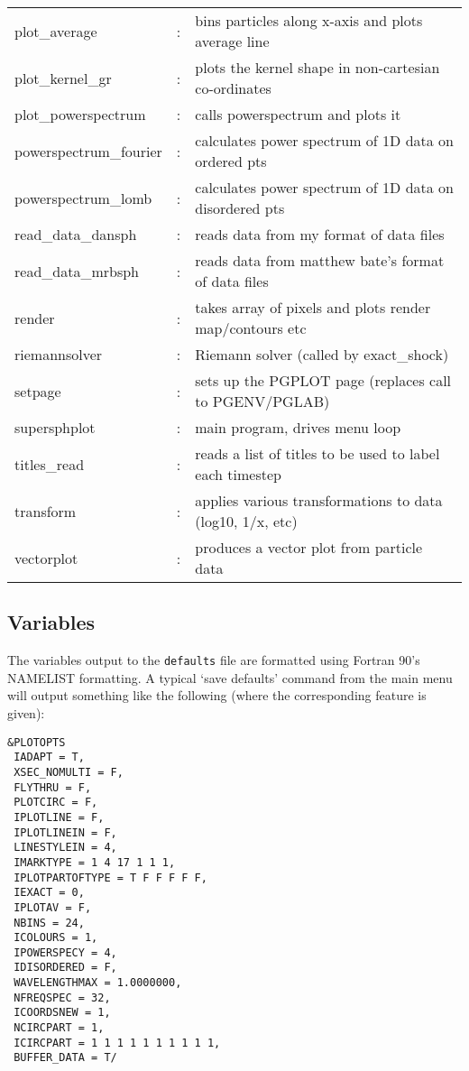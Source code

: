 \documentclass[a4paper,12pt]{article}
\begin{document}
\begin{longtable}{|lcp{}|}
plot\_average	 & : & bins particles along x-axis and plots average line\\
plot\_kernel\_gr     & : & plots the kernel shape in non-cartesian co-ordinates\\
plot\_powerspectrum & : & calls powerspectrum and plots it\\
powerspectrum\_fourier & : & calculates power spectrum of 1D data on ordered pts\\
powerspectrum\_lomb & : & calculates power spectrum of 1D data on disordered pts\\
read\_data\_dansph   & : & reads data from my format of data files\\
read\_data\_mrbsph   & : & reads data from matthew bate's format of data files\\
render	 	 & : & takes array of pixels and plots render map/contours etc\\
riemannsolver      & : & Riemann solver (called by exact\_shock)\\
setpage            & : & sets up the PGPLOT page (replaces call to PGENV/PGLAB)\\
supersphplot	 & : & main program, drives menu loop\\
titles\_read        & : & reads a list of titles to be used to label each timestep\\
transform	 	 & : & applies various transformations to data (log10, 1/x, etc)\\
vectorplot         & : & produces a vector plot from particle data
\end{longtable}

\subsection{Variables}
\label{sec:variables}
 The variables output to the \verb+defaults+ file are formatted using Fortran 90's NAMELIST
formatting. A typical `save defaults' command from the main menu will output something
like the following (where the corresponding feature is given):
\begin{verbatim}
&PLOTOPTS
 IADAPT = T,
 XSEC_NOMULTI = F,
 FLYTHRU = F,
 PLOTCIRC = F,
 IPLOTLINE = F,
 IPLOTLINEIN = F,
 LINESTYLEIN = 4,
 IMARKTYPE = 1 4 17 1 1 1,
 IPLOTPARTOFTYPE = T F F F F F,
 IEXACT = 0,
 IPLOTAV = F,
 NBINS = 24,
 ICOLOURS = 1,
 IPOWERSPECY = 4,
 IDISORDERED = F,
 WAVELENGTHMAX = 1.0000000,
 NFREQSPEC = 32,
 ICOORDSNEW = 1,
 NCIRCPART = 1,
 ICIRCPART = 1 1 1 1 1 1 1 1 1 1,
 BUFFER_DATA = T/
\end{verbatim}
\end{document}
